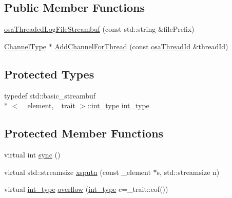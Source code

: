 \subsection*{Public Member Functions}
\begin{DoxyCompactItemize}
\item 
\hyperlink{classosa_threaded_log_file_streambuf_a4ef5ef4896d14022f68b32dbeafbd0c2}{osa\-Threaded\-Log\-File\-Streambuf} (const std\-::string \&file\-Prefix)
\item 
\hyperlink{classosa_threaded_log_file_streambuf_a216ca33908152519430e5456e828805f}{Channel\-Type} $\ast$ \hyperlink{classosa_threaded_log_file_streambuf_a059c2cbfffeb0ecc80cdf23c1f1939e6}{Add\-Channel\-For\-Thread} (const \hyperlink{classosa_thread_id}{osa\-Thread\-Id} \&thread\-Id)
\end{DoxyCompactItemize}
\subsection*{Protected Types}
\begin{DoxyCompactItemize}
\item 
typedef std\-::basic\-\_\-streambuf\\*
$<$ \-\_\-element, \-\_\-trait $>$\-::\hyperlink{classosa_threaded_log_file_streambuf_aac7f3a06c7b5f2824da9634732698e4b}{int\-\_\-type} \hyperlink{classosa_threaded_log_file_streambuf_aac7f3a06c7b5f2824da9634732698e4b}{int\-\_\-type}
\end{DoxyCompactItemize}
\subsection*{Protected Member Functions}
\begin{DoxyCompactItemize}
\item 
virtual int \hyperlink{classosa_threaded_log_file_streambuf_aaf9cb36fea5412016f33e84b029c40c8}{sync} ()
\item 
virtual std\-::streamsize \hyperlink{classosa_threaded_log_file_streambuf_a81d062496b7afa56309b41909f63cbe9}{xsputn} (const \-\_\-element $\ast$s, std\-::streamsize n)
\item 
virtual \hyperlink{classosa_threaded_log_file_streambuf_aac7f3a06c7b5f2824da9634732698e4b}{int\-\_\-type} \hyperlink{classosa_threaded_log_file_streambuf_aecc7d94de57ab54fc8ab15ff941e5f92}{overflow} (\hyperlink{classosa_threaded_log_file_streambuf_aac7f3a06c7b5f2824da9634732698e4b}{int\-\_\-type} c=\-\_\-trait\-::eof())
\end{DoxyCompactItemize}


